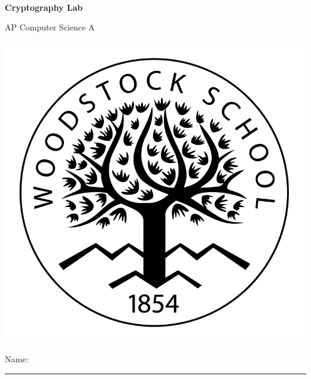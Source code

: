 
\usepackage{amssymb}
\usepackage[utf8]{inputenc}

\def\LabCourse{AP Computer Science A}
\def\LabNumber{06}
\def\LabTitle{Cryptography Lab}


	\begin{coverpages}
		\ \\[2cm]
		\begin{center}
			\huge
			\textbf{\LabTitle}

			\Large
			\LabCourse
		\end{center}

		\vspace{1.5cm}

		\begin{center}
			\includegraphics[scale=0.45]{graphics/logo_black}

			\vspace{2.5cm}

			\Large
			Name: \rule{11.5cm}{0.1pt}
		\end{center}
	\end{coverpages}

	\blankpage

	\thispagestyle{empty}
	\tableofcontents

	\pagebreak

